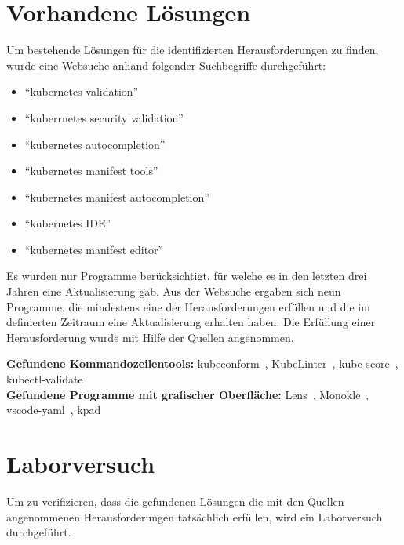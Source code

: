 \section{Vorhandene Lösungen}

Um bestehende Lösungen für die identifizierten Herausforderungen zu finden, wurde eine Websuche anhand folgender Suchbegriffe durchgeführt:
\begin{itemize}
  \setlength\itemsep{-0.5cm}
  \item ``kubernetes validation''
  \item ``kuberrnetes security validation''
  \item ``kubernetes autocompletion''
  \item ``kubernetes manifest tools''
  \item ``kubernetes manifest autocompletion''
  \item ``kubernetes IDE''
  \item ``kubernetes manifest editor''
\end{itemize}

Es wurden nur Programme berücksichtigt, für welche es in den letzten drei Jahren eine Aktualisierung gab.
Aus der Websuche ergaben sich neun Programme, die mindestens eine der Herausforderungen erfüllen und die
im definierten Zeitraum eine Aktualisierung erhalten haben.
Die Erfüllung einer Herausforderung wurde mit Hilfe der Quellen angenommen.

\textbf{Gefundene Kommandozeilentools:} kubeconform~\cite{kubeconform-source}, KubeLinter~\cite{kubelinter-source}, kube-score~\cite{kubescore-source}, kubectl-validate~\cite{kubectl-validate-source}
\\
\textbf{Gefundene Programme mit grafischer Oberfläche:} Lens~\cite{kubernetes-lens-source}, Monokle~\cite{monokle-source}, vscode-yaml~\cite{vscode-yaml-source}, kpad~\cite{kpad-source}


\section{Laborversuch}

Um zu verifizieren, dass die gefundenen Lösungen die mit den Quellen angenommenen Herausforderungen tatsächlich erfüllen, wird ein Laborversuch durchgeführt.

